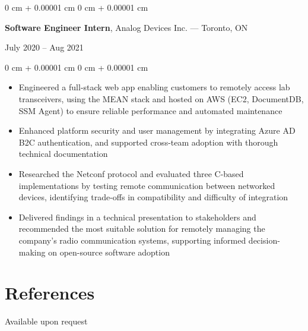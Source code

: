 \documentclass[10pt, letterpaper]{article}
\newenvironment{highlights}{
    \begin{itemize}[
        topsep=0.10 cm,
        parsep=0.10 cm,
        partopsep=0pt,
        itemsep=0pt,
        leftmargin=0 cm + 10pt
    ]
}{
    \end{itemize}
} %
\newenvironment{onecolentry}{
    \begin{adjustwidth}{
        0 cm + 0.00001 cm
    }{
        0 cm + 0.00001 cm
    }
}{
    \end{adjustwidth}
} %
\newenvironment{twocolentry}[2][]{
    \onecolentry
    \def\secondColumn{#2}
    \setcolumnwidth{\fill, 4 cm}
    \begin{paracol}{2}
}{
    \switchcolumn \raggedleft \secondColumn
    \end{paracol}
    \endonecolentry
} %
\begin{document}
        \begin{twocolentry}{July 2020 -- Aug 2021}
            \textbf{Software Engineer Intern}, Analog Devices Inc. --- Toronto, ON
        \end{twocolentry}
        \vspace{0.10 cm}
        \begin{onecolentry}
            \begin{highlights}
                \item Engineered a full-stack web app enabling customers to remotely access lab transceivers, using the MEAN stack and hosted on AWS (EC2, DocumentDB, SSM Agent) to ensure reliable performance and automated maintenance
                \item Enhanced platform security and user management by integrating Azure AD B2C authentication, and supported cross-team adoption with thorough technical documentation 
                \item Researched the Netconf protocol and evaluated three C-based implementations by testing remote communication between networked devices, identifying trade-offs in compatibility and difficulty of integration
                \item Delivered findings in a technical presentation to stakeholders and recommended the most suitable solution for remotely managing the company's radio communication systems, supporting informed decision-making on open-source software adoption
            \end{highlights}
        \end{onecolentry}
        
    \section{References}
        Available upon request
\end{document}
